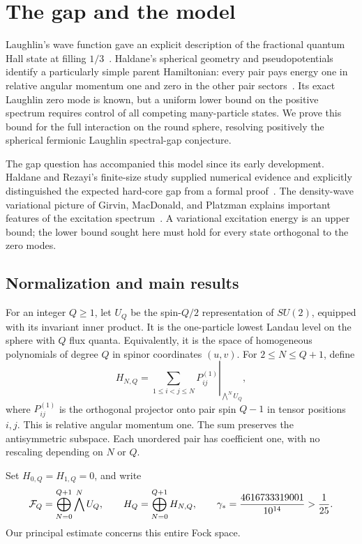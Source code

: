 \section{The gap and the model}
\label{sec:intro}
Laughlin's wave function gave an explicit description of the fractional
quantum Hall state at filling $1/3$~\cite{Laughlin}. Haldane's spherical
geometry and pseudopotentials identify a particularly simple parent
Hamiltonian: every pair pays energy one in relative angular momentum one
and zero in the other pair sectors~\cite{Haldane}. Its exact Laughlin
zero mode is known, but a uniform lower bound on the positive spectrum
requires control of all competing many-particle states. We prove this
bound for the full interaction on the round sphere, resolving positively
the spherical fermionic Laughlin spectral-gap conjecture.

The gap question has accompanied this model since its early development.
Haldane and Rezayi's finite-size study supplied numerical evidence and
explicitly distinguished the expected hard-core gap from a formal
proof~\cite{HaldaneRezayi1985FiniteSize}. The density-wave variational
picture of Girvin, MacDonald, and Platzman explains important features of
the excitation spectrum~\cite{GMP}. A variational excitation energy is
an upper bound; the lower bound sought here must hold for every state
orthogonal to the zero modes.

\subsection{Normalization and main results}
For an integer \(Q\ge1\), let \(U_Q\) be the spin-\(Q/2\) representation of
\(SU(2)\), equipped with its invariant inner product. It is the one-particle
lowest Landau level on the sphere with \(Q\) flux quanta. Equivalently, it is
the space of homogeneous polynomials of degree \(Q\) in spinor coordinates
\((u,v)\). For \(2\le N\le Q+1\), define
\begin{equation}\label{eq:physicalH}
 H_{N,Q}=\left.\sum_{1\le i<j\le N}P_{ij}^{(1)}
          \right|_{\bigwedge^N U_Q},
\end{equation}
where \(P_{ij}^{(1)}\) is the orthogonal projector onto pair spin \(Q-1\)
in tensor positions \(i,j\). This is relative angular momentum one. The sum
preserves the antisymmetric subspace. Each unordered pair has coefficient
one, with no rescaling depending on \(N\) or \(Q\).

Set \(H_{0,Q}=H_{1,Q}=0\), and write
\[
 \mathcal F_Q=\bigoplus_{N=0}^{Q+1}\bigwedge^N U_Q,\qquad
 H_Q=\bigoplus_{N=0}^{Q+1}H_{N,Q},\qquad
 \gamma_*=\frac{4616733319001}{10^{14}}> \frac1{25}.
\]
Our principal estimate concerns this entire Fock space.

